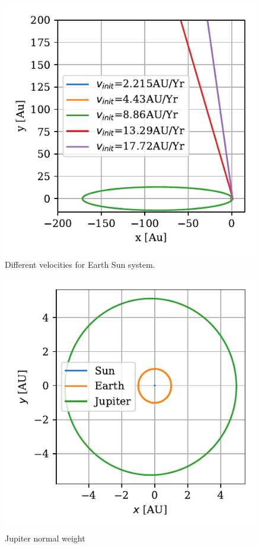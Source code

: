 \documentclass[twocolumn]{aastex62}
\begin{document}
\begin{figure}
\includegraphics[scale=1]{Figures/espace.pdf}
\caption{Different velocities for Earth Sun system.}
\label{fig:escape}
\end{figure}

\begin{figure}
\includegraphics[scale=1]{Figures/jupiter.pdf}
\caption{Jupiter normal weight}
\label{fig:jupiter}
\end{figure}
\end{document}
